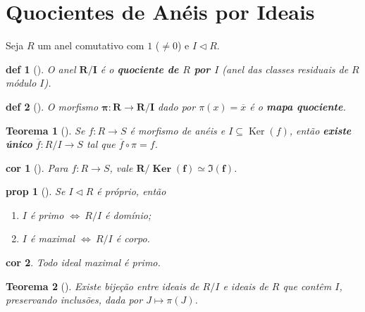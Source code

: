 \documentclass[11pt]{article}
\DeclareMathOperator{\Ker}{Ker}   %
\newcommand{\defname}[1]{\colorbox{yellow!30}{\strut \textbf{#1}}}
\newtheorem*{theorem}{Teorema}
\newtheorem*{proposition}{prop}
\newtheorem*{corollary}{cor}
\newtheorem*{definition}{def}
\theoremstyle{definition}
\begin{document}
\section{Quocientes de Anéis por Ideais}
\begin{multicols}{3}
Seja $R$ um anel comutativo com $1$ (\(\neq 0\)) e \(I\triangleleft R\).



\begin{definition}[\defname{Anel Quociente}]
O anel \(\mathbf{R/I}\) é o \textbf{quociente de \(R\) por \(I\)} (anel das classes residuais de \(R\) módulo \(I\)).
\end{definition}

\begin{definition}[\defname{Mapa Quociente (Anéis)}]
O morfismo \(\mathbf{\pi:R\to R/I}\) dado por \(\pi(x)=\overline{x}\) é o \textbf{mapa quociente}.
\end{definition}



\begin{theorem}[\defname{Propri. Universal do Quociente}]
Se \(f:R\to S\) é morfismo de anéis e \(I\subseteq\Ker(f)\), então \textbf{existe único} \(\overline{f}:R/I\to S\) tal que \(\overline{f}\circ \pi=f\).
\end{theorem}

\begin{corollary}[\defname{Teorema do Isomorfismo}]
Para \(f:R\to S\), vale \(\mathbf{R/\Ker(f)\simeq \Im(f)}\).
\end{corollary}

\begin{proposition}[\defname{Caracterização de Id Primos e Max}]
Se \(I\triangleleft R\) é próprio, então
\begin{enumerate}[label=(\alph*)]
\item \(I\) é primo \(\iff\ R/I\) é domínio;
\item \(I\) é maximal \(\iff\ R/I\) é corpo.
\end{enumerate}
\end{proposition}

\begin{corollary}
Todo ideal maximal é primo.
\end{corollary}

\begin{theorem}[\defname{Correspondência}]
Existe bijeção entre ideais de \(R/I\) e ideais de \(R\) que contêm \(I\), preservando inclusões, dada por \(J\mapsto \pi(J)\).
\end{theorem}


\end{multicols}
\end{document}
